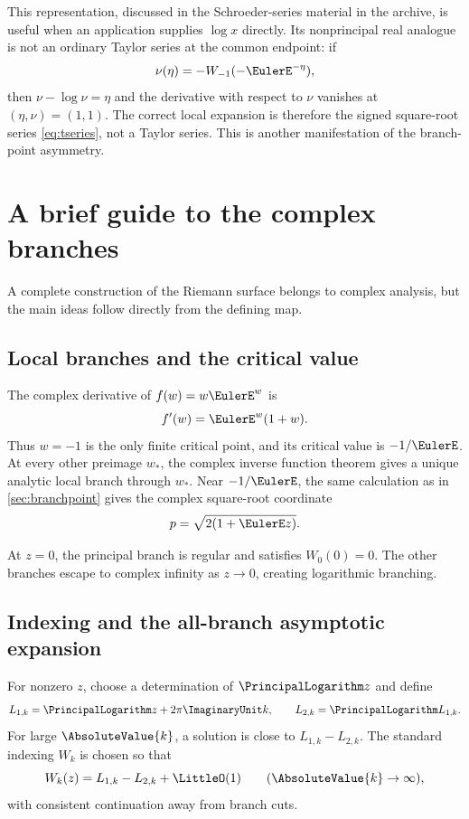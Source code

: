 \documentclass[11pt]{article}
\theoremstyle{remark}
\begin{document}
This representation, discussed in the Schroeder-series material in the
archive, is useful when an application supplies \(\log x\) directly.  Its
nonprincipal real analogue is not an ordinary Taylor series at the common
endpoint: if
\[
       \nu(\eta)=-W_{-1}(-\EulerE^{-\eta}),
\]
then \(\nu-\log\nu=\eta\) and the derivative with respect to \(\nu\)
vanishes at \((\eta,\nu)=(1,1)\).  The correct local expansion is therefore
the signed square-root series \eqref{eq:tseries}, not a Taylor series.  This
is another manifestation of the branch-point asymmetry.

\section{A brief guide to the complex branches}\label{sec:complex}

A complete construction of the Riemann surface belongs to complex analysis,
but the main ideas follow directly from the defining map.

\subsection{Local branches and the critical value}

The complex derivative of \(f(w)=w\EulerE^w\) is
\[
       f'(w)=\EulerE^w(1+w).
\]
Thus \(w=-1\) is the only finite critical point, and its critical value is
\(-1/\EulerE\).  At every other preimage \(w_*\), the complex inverse function
theorem gives a unique analytic local branch through \(w_*\).  Near
\(-1/\EulerE\), the same calculation as in \cref{sec:branchpoint} gives the
complex square-root coordinate
\[
       p=\sqrt{2(1+\EulerE z)}.
\]

At \(z=0\), the principal branch is regular and satisfies \(W_0(0)=0\).
The other branches escape to complex infinity as \(z\to0\), creating
logarithmic branching.

\subsection{Indexing and the all-branch asymptotic expansion}

For nonzero \(z\), choose a determination of \(\PrincipalLogarithm z\) and define
\[
       L_{1,k}=\PrincipalLogarithm z+2\pi\ImaginaryUnit k,\qquad
       L_{2,k}=\PrincipalLogarithm L_{1,k}.
\]
For large \(\AbsoluteValue{k}\), a solution is close to
\(L_{1,k}-L_{2,k}\).  The standard indexing \(W_k\) is chosen so that
\begin{equation}\label{eq:complex-leading}
       W_k(z)=L_{1,k}-L_{2,k}+\LittleO(1)
       \qquad(\AbsoluteValue{k}\to\infty),
\end{equation}
with consistent continuation away from branch cuts.
\end{document}
